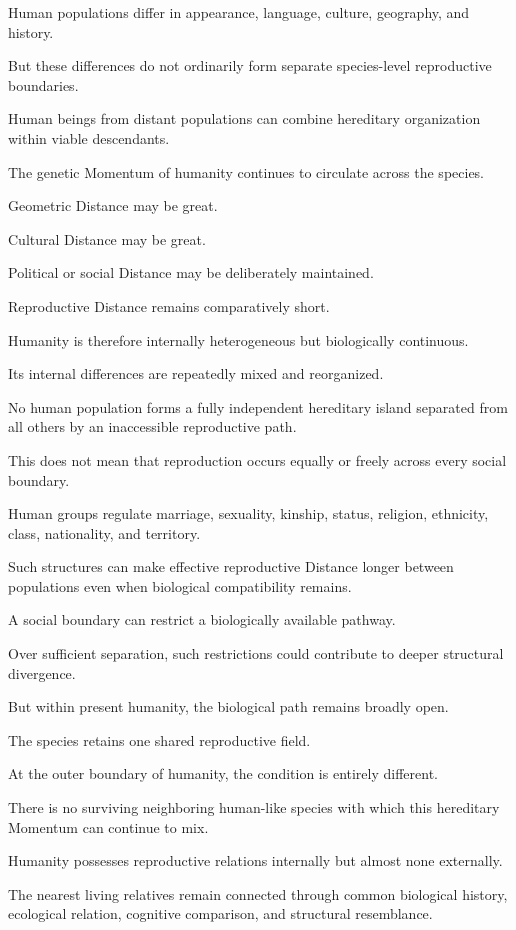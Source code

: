 Human populations differ in appearance, language, culture, geography, and history.

But these differences do not ordinarily form separate species-level reproductive boundaries.

Human beings from distant populations can combine hereditary organization within viable descendants.

The genetic Momentum of humanity continues to circulate across the species.

Geometric Distance may be great.

Cultural Distance may be great.

Political or social Distance may be deliberately maintained.

Reproductive Distance remains comparatively short.

Humanity is therefore internally heterogeneous but biologically continuous.

Its internal differences are repeatedly mixed and reorganized.

No human population forms a fully independent hereditary island separated from all others by an inaccessible reproductive path.

This does not mean that reproduction occurs equally or freely across every social boundary.

Human groups regulate marriage, sexuality, kinship, status, religion, ethnicity, class, nationality, and territory.

Such structures can make effective reproductive Distance longer between populations even when biological compatibility remains.

A social boundary can restrict a biologically available pathway.

Over sufficient separation, such restrictions could contribute to deeper structural divergence.

But within present humanity, the biological path remains broadly open.

The species retains one shared reproductive field.

At the outer boundary of humanity, the condition is entirely different.

There is no surviving neighboring human-like species with which this hereditary Momentum can continue to mix.

Humanity possesses reproductive relations internally but almost none externally.

The nearest living relatives remain connected through common biological history, ecological relation, cognitive comparison, and structural resemblance.

